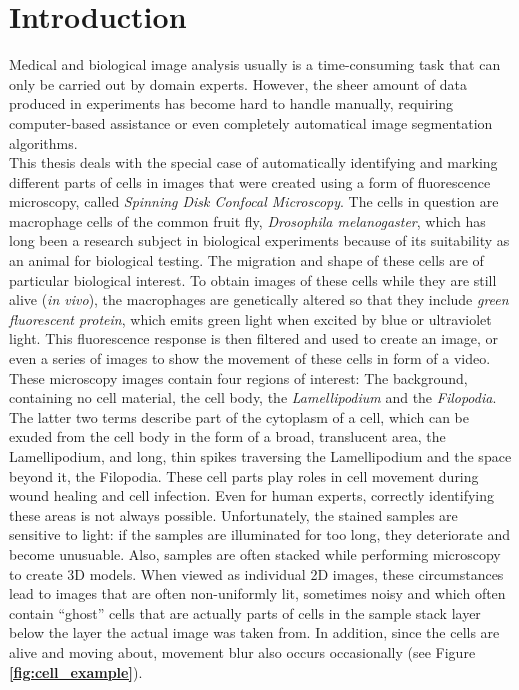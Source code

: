 \chapter{Introduction}
Medical and biological image analysis usually is a time-consuming task that can only be carried out by domain experts. However, the sheer amount of data produced in experiments has become hard to handle manually, requiring computer-based assistance or even completely automatical image segmentation algorithms.\\

\noindent This thesis deals with the special case of automatically identifying and marking different parts of cells in images that were created using a form of fluorescence microscopy, called \textit{Spinning Disk Confocal Microscopy}. The cells in question are macrophage cells of the common fruit fly, \textit{Drosophila melanogaster}, which has long been a research subject in biological experiments because of its suitability as an animal for biological testing. The migration and shape of these cells are of particular biological interest. To obtain images of these cells while they are still alive (\textit{in vivo}), the macrophages are genetically altered so that they include \textit{green fluorescent protein}, which emits green light when excited by blue or ultraviolet light. This fluorescence response is then filtered and used to create an image, or even a series of images to show the movement of these cells in form of a video. These microscopy images contain four regions of interest: The background, containing no cell material, the cell body, the \textit{Lamellipodium} and the \textit{Filopodia}. The latter two terms describe part of the cytoplasm of a cell, which can be exuded from the cell body in the form of a broad, translucent area, the Lamellipodium, and long, thin spikes traversing the Lamellipodium and the space beyond it, the Filopodia. These cell parts play roles in cell movement during wound healing and cell infection. Even for human experts, correctly identifying these areas is not always possible. Unfortunately, the stained samples are sensitive to light: if the samples are illuminated for too long, they deteriorate and become unusuable. Also, samples are often stacked while performing microscopy to create 3D models. When viewed as individual 2D images, these circumstances lead to images that are often non-uniformly lit, sometimes noisy and which often contain ``ghost'' cells that are actually parts of cells in the sample stack layer below the layer the actual image was taken from. In addition, since the cells are alive and moving about, movement blur also occurs occasionally (see Figure \textbf{\ref{fig:cell_example}}). \cite{bioimage, bioimage2}

